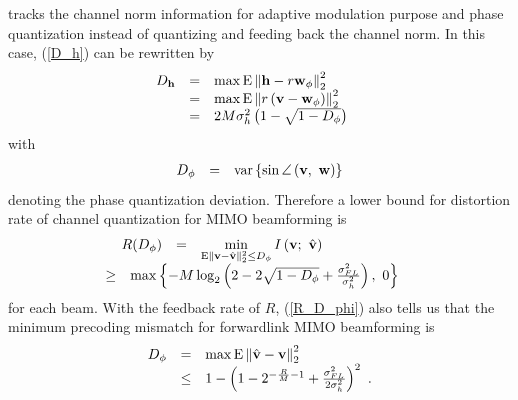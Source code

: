 \documentclass[10pt,fleqn, twocolumn]{IEEEtran}
\newcommand{\bh}{{\bf h}}
\newcommand{\bv}{{\bf v}}
\newcommand{\bw}{{\bf w}}
\begin{document}
tracks the channel norm information for adaptive modulation
purpose and phase quantization instead of quantizing and feeding
back the channel norm. In this case, (\ref{D_h}) can be rewritten
by
\begin{equation}\hspace{-0.15in}
\begin{array}{rcl}
D_{\bh}&=&\max{\rm E}\left\|\bh-r{\bw}_{\phi}\right\|_{2}^{2}\\
&=&\max{\rm E}\left\|r\left(\bv-{\bw}_{\phi}\right)\right\|_{2}^{2}\\
&=&2M\sigma_{h}^{2}\left(1-\sqrt{1-D_{\phi}}\right)
\end{array}\label{D_h2}
\end{equation}
\noindent with
\begin{equation}%
\begin{array}{rcl}
D_{\phi}&=&{\rm var}\left\{\sin\angle\left(\bv,\
\bw\right)\right\}
\end{array}
\end{equation}
\noindent denoting the phase quantization deviation. Therefore a
lower bound for distortion rate of channel quantization for MIMO
beamforming is
\begin{equation}%
\begin{array}{rcl}
R(D_{\phi})&=&\min\limits_{{\rm E}\|\bv-\hat{\bv}\|_{2}^{2}\leq
D_{\phi}} I\left(\bv;\
\hat{\bv}\right)\\
&\hspace{-1.40in}\geq&\hspace{-0.70in}\max\left\{
-M\log_{2}\left(2-2\sqrt{1-D_{\phi}}+\frac{\sigma_{\mbox{\tiny
FL}}^{2}}{\sigma_{h}^{2}}\right),\ 0\right\}
\end{array}\label{R_D_phi}
\end{equation}
\noindent for each beam. With the feedback rate of $R$,
(\ref{R_D_phi}) also tells us that the minimum precoding mismatch
for forwardlink MIMO beamforming is
\begin{equation}%
\begin{array}{rcl}
D_{\phi}&=&\max{\rm E}\left\|\hat{\bv}-\bv\right\|_{2}^{2}\\
 &\leq&1-\left(1-2^{-\frac{R}{M}-1}+\frac{\sigma_{\mbox{\tiny
FL}}^{2}}{2\sigma_{h}^{2}}\right)^{2}\ .
\end{array}\label{D_phi}
\end{equation}
\end{document}
